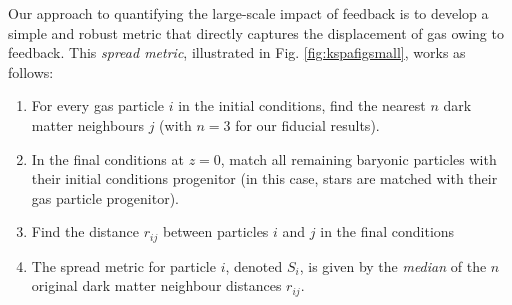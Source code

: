 Our approach to quantifying the large-scale impact of feedback is to develop
a simple and robust metric that directly captures the displacement of gas
owing to feedback. This {\it spread metric}, illustrated in Fig.
\ref{fig:kspafigsmall}, works as follows:

\begin{enumerate} 
	\item For every gas particle $i$ in the initial conditions, find the nearest
          $n$ dark matter neighbours $j$ (with $n=3$ for our fiducial results).
	\item In the final conditions at $z=0$, match all remaining baryonic particles
	      with their initial conditions progenitor (in this case, stars are
	      matched with their gas particle progenitor).
    \item Find the distance $r_{ij}$ between particles $i$ and $j$ in the
          final conditions
    \item The spread metric for particle $i$, denoted $S_{i}$, is given by the \emph{median}
          of the $n$ original dark matter neighbour distances $r_{ij}$.
\end{enumerate}

